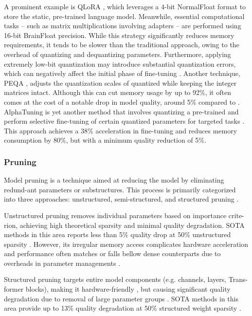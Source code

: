         A prominent example is QLoRA \cite{qlora}, which leverages a 4-bit NormalFloat format to store the static, pre-trained language model. Meanwhile, essential computational tasks -- such as matrix multiplications involving \lora{} adapters -- are performed using 16-bit BrainFloat precision. While this strategy significantly reduces memory requirements, it tends to be slower than the traditional \lora{} approach, owing to the overhead of quantizing and dequantizing \llm{} parameters. Furthermore, applying extremely low-bit quantization may introduce substantial quantization errors, which can negatively affect the initial phase of \lora{} fine-tuning \cite{han2024parameterefficientfinetuninglargemodels}. Another technique, PEQA \cite{peqa}, adjusts the quantization scales of quantized \llm{} while keeping the integer matrices intact. Although this can cut memory usage by up to 92\%, it often comes at the cost of a notable drop in model quality, around 5\% compared to \lora{}. AlphaTuning is yet another method that involves quantizing a pre-trained \llm{} and perform selective fine-tuning of certain quantized parameters for targeted tasks \cite{AlphaTuning}. This approach achieves a 38\% acceleration in fine-tuning and reduces memory consumption by 80\%, but with a minimum quality reduction of 5\%.
    \subsubsection{Pruning}
        Model pruning is a technique aimed at reducing the model by eliminating redund-ant parameters or substructures. This process is primarily categorized into three approaches: unstructured, semi-structured, and structured pruning \cite{model_pruning}.

        Unstructured pruning removes individual parameters based on importance crite-rion, achieving high theoretical sparsity and minimal quality degradation. SOTA methods in this area reports less than 5\% quality drop at 50\% unstructured sparsity \cite{xu2024besapruninglargelanguage}. However, its irregular memory access complicates hardware acceleration \cite{MLSYS2023_a10deb4d} and performance often matches or falls bellow dense counterparts due to overheads in parameter managements \cite{bambhaniya2024progressivegradientflowrobust}.

        Structured pruning targets entire model components (e.g. channels, layers, Trans-former blocks), making it hardware-friendly \cite{bambhaniya2024progressivegradientflowrobust}, but causing significant quality degradation due to removal of large parameter groups \cite{cheng2024surveydeepneuralnetwork}. SOTA methods in this area provide up to 13\% quality degradation at 50\% structured weight sparsity \cite{llm_pruner}. 

